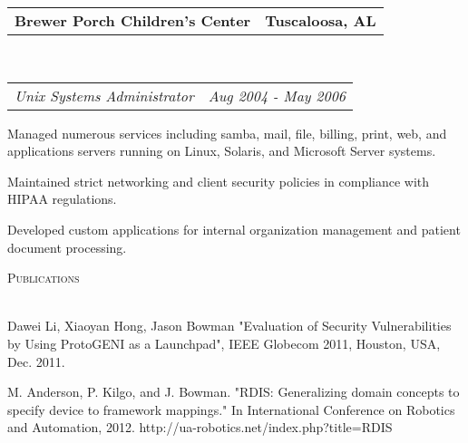 \documentclass[10pt,letterpaper]{article}
\makeatletter
\newcommand{\lineunder}{\vspace*{-8pt} \\ \hspace*{-18pt} \hrulefill \\}
\newcommand{\header}[1]{{\hspace*{-15pt}\vspace*{6pt} \textsc{#1}} \vspace*{-6pt} \lineunder}
\newcommand{\headerrow}[2]
{\begin{tabular*}{\linewidth}{l@{\extracolsep{\fill}}r}
	#1 &
	#2 \\
\end{tabular*}}
\newcommand{\employment}[5]{
	\headerrow
		{\textbf{#1}}
		{\textbf{#2}}
	\\
	\headerrow
		{\emph{#3}}
		{\emph{#4}}
	\begin{itemize*}
		\item #5
	\end{itemize*}
}
\makeatother
\begin{document}

\employment{Brewer Porch Children's Center}{Tuscaloosa, AL}{Unix Systems
  Administrator}{Aug 2004 - May 2006}{
Managed numerous services including samba, mail, file, billing, print, web, and applications servers running on Linux, Solaris, and Microsoft Server systems.
\item Maintained strict networking and client security policies in compliance with HIPAA regulations.
\item Developed custom applications for internal organization management and patient document processing.
}
\vspace*{3pt}
\header{Publications}
\begin{itemize*}
\item Dawei Li, Xiaoyan Hong, Jason Bowman "Evaluation of Security Vulnerabilities by Using ProtoGENI as a Launchpad", IEEE Globecom 2011, Houston, USA, Dec. 2011.
\item M. Anderson, P. Kilgo, and J. Bowman. "RDIS: Generalizing domain concepts to specify device to framework mappings." In International Conference on Robotics and Automation, 2012. http://ua-robotics.net/index.php?title=RDIS
\end{itemize*}
\vspace*{8pt}

	
\end{document}
